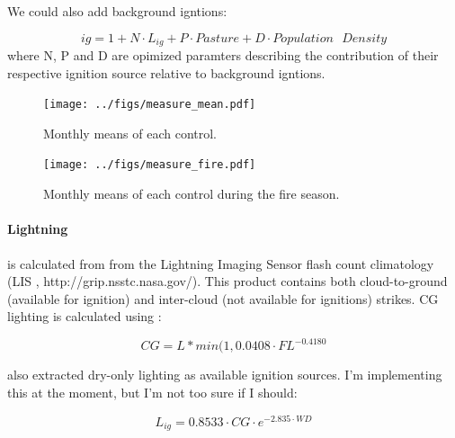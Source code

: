 \begin{shaded}
    We could also add background igntions:

    \begin{equation}
        ig = 1 + N \cdot L_{ig} + P \cdot Pasture + D \cdot Population\text{ }Density
    \end{equation}
    where N, P and D are opimized paramters describing the contribution of their respective ignition source relative to background igntions.
\end{shaded}


\begin{figure}[!ht]
  \centering
    \texttt{[image: ../figs/measure\_mean.pdf]}
  \caption{Monthly means of each control. }
  \label{fig:Monthly_mean_controls}
\end{figure}

\begin{figure}[!ht]
  \centering
    \texttt{[image: ../figs/measure\_fire.pdf]}
  \caption{Monthly means of each control during the fire season. }
  \label{fig:Season_mean_controls}
\end{figure}

\paragraph{Lightning}
is calculated from
from the Lightning Imaging Sensor flash count climatology (LIS \cite{christian1999lightning}, http://grip.nsstc.nasa.gov/). 
This product contains both cloud-to-ground (available for ignition) and inter-cloud (not available for ignitions) strikes.
CG lighting is calculated using \citet{kelley2014improved}:

\begin{equation}
    CG = L * min(1, 0.0408 \cdot FL^{-0.4180}
\end{equation}

\begin{shaded}
    \citet{kelley2014improved} also extracted dry-only lighting as available ignition sources. I'm implementing this at the moment, but I'm not too sure if I should:

\begin{equation}
    L_{ig} = 0.8533 \cdot CG \cdot e^{-2.835 \cdot WD}
\end{equation}
\end{shaded}

